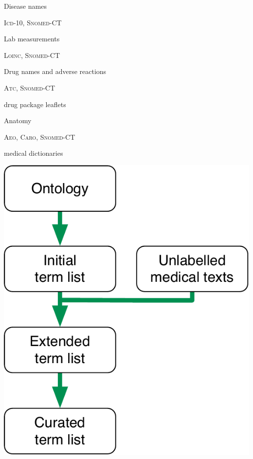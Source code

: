 \documentclass[landscape,footrule]{foils}
\begin{document}
\begin{minipage}[b]{12cm}
Disease names 
\begin{diamonds}
\item \textsc{Icd-10}, \textsc{Snomed-CT}
\end{diamonds}\vspace*{4ex}

Lab measurements
\begin{diamonds}
\item \textsc{Loinc}, \textsc{Snomed-CT}
\end{diamonds}\vspace*{4ex}

Drug names and adverse reactions
\begin{diamonds}
\item \textsc{Atc}, \textsc{Snomed-CT}
\item drug package leaflets
\end{diamonds}\vspace*{4ex}

Anatomy
\begin{diamonds}
\item  \textsc{Aeo}, \textsc{Caro}, \textsc{Snomed-CT}
\item medical dictionaries
\end{diamonds}
\vspace*{3ex}
\end{minipage}
\hspace*{0.5cm}
\includegraphics[scale=1.0, trim=0cm -0.25cm 0cm 0cm, clip]{term-extraction}
\end{document}
